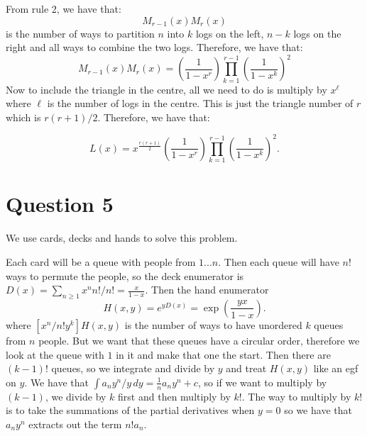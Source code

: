 \documentclass[]{article}
\theoremstyle{definition}
\numberwithin{theorem}{section}
\numberwithin{equation}{section}
\begin{document}
From rule 2, we have that:
\begin{equation}
	[x^n] M_{r-1} (x) M_{r}(x)
\end{equation}
is the number of ways to partition $n$ into $k$ logs on the left, $n - k$ logs on the right and all ways to combine the two logs. Therefore, we have that:
\begin{equation}
	M_{r-1} (x) M_{r}(x) = \left(\frac{1}{1 - x^r}\right) \prod_{k = 1}^{r - 1} \left(\frac{1}{1 - x^k}\right)^2 
\end{equation}
Now to include the triangle in the centre, all we need to do is multiply by $x^\ell$ where $\ell$ is the number of logs in the centre. This is just the triangle number of $r$ which is $r(r + 1)/2$. Therefore, we have that:

\begin{equation}
	L(x) = x^{\frac{r(r + 1)}{2}} \left(\frac{1}{1 - x^r}\right) \prod_{k = 1}^{r - 1} \left(\frac{1}{1 - x^k}\right)^2.
\end{equation}
\section{Question 5}

We use cards, decks and hands to solve this problem.

Each card will be a queue with people from $1...n$. Then each queue will have $n!$ ways to permute the people, so the deck enumerator is $D(x) = \sum_{n \geq 1} x^n n!/n! = \frac{x}{1-x}$. 
Then the hand enumerator
\begin{equation}
	H(x,y) = e^{y D(x)} = \exp\left( \frac{yx}{1-x}\right).
\end{equation}
where $[x^n/n! y^k] H(x,y)$ is the number of ways to have unordered $k$ queues from $n$ people. But we want that these queues have a circular order, therefore we look at the queue with $1$ in it and make that one the start. Then there are $(k - 1)!$ queues, so we integrate and divide by $y$ and treat $H(x, y)$ like an egf on $y$. We have that $\int a_n y^n/y \, dy = \frac{1}{n} a_n y^n + c$, so if we want to multiply by $(k - 1)$, we divide by $k$ first and then multiply by $k!$. The way to multiply by $k!$ is to take the summations of the partial derivatives when $y = 0$ so we have that $a_n y^n$ extracts out the term $n! a_n$. 
\end{document}

